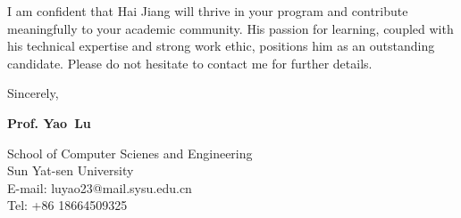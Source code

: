 \documentclass{article}
\begin{document}
I am confident that Hai Jiang will thrive in your program and contribute meaningfully to your academic community. 
His passion for learning, coupled with his technical expertise and strong work ethic, 
positions him as an outstanding candidate. 
Please do not hesitate to contact me for further details.

 


\bigskip %

Sincerely,
\vspace{30pt} %

\textbf{Prof. Yao~Lu}\\
\vspace{20pt}

School of Computer Scienes and Engineering\\
Sun Yat-sen University\\
E-mail: luyao23@mail.sysu.edu.cn\\ 
Tel: +86 18664509325


\end{document}
